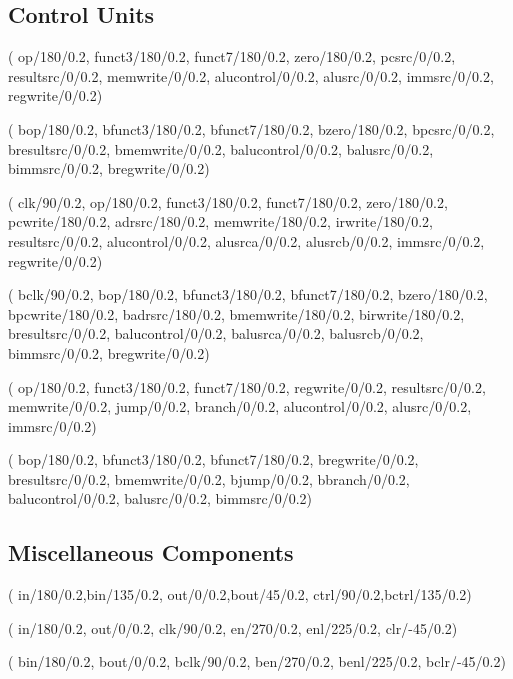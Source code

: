 \documentclass[10pt,a4paper]{scrartcl}
\begin{document}
\subsection{Control Units}
(
op/180/0.2,
funct3/180/0.2,
funct7/180/0.2,
zero/180/0.2,
pcsrc/0/0.2,
resultsrc/0/0.2,
memwrite/0/0.2,
alucontrol/0/0.2,
alusrc/0/0.2,
immsrc/0/0.2,
regwrite/0/0.2)

(
bop/180/0.2,
bfunct3/180/0.2,
bfunct7/180/0.2,
bzero/180/0.2,
bpcsrc/0/0.2,
bresultsrc/0/0.2,
bmemwrite/0/0.2,
balucontrol/0/0.2,
balusrc/0/0.2,
bimmsrc/0/0.2,
bregwrite/0/0.2)

(
clk/90/0.2,
op/180/0.2,
funct3/180/0.2,
funct7/180/0.2,
zero/180/0.2,
pcwrite/180/0.2,
adrsrc/180/0.2,
memwrite/180/0.2,
irwrite/180/0.2,
resultsrc/0/0.2,
alucontrol/0/0.2,
alusrca/0/0.2,
alusrcb/0/0.2,
immsrc/0/0.2,
regwrite/0/0.2)

(
bclk/90/0.2,
bop/180/0.2,
bfunct3/180/0.2,
bfunct7/180/0.2,
bzero/180/0.2,
bpcwrite/180/0.2,
badrsrc/180/0.2,
bmemwrite/180/0.2,
birwrite/180/0.2,
bresultsrc/0/0.2,
balucontrol/0/0.2,
balusrca/0/0.2,
balusrcb/0/0.2,
bimmsrc/0/0.2,
bregwrite/0/0.2)

(
op/180/0.2,
funct3/180/0.2,
funct7/180/0.2,
regwrite/0/0.2,
resultsrc/0/0.2,
memwrite/0/0.2,
jump/0/0.2,
branch/0/0.2,
alucontrol/0/0.2,
alusrc/0/0.2,
immsrc/0/0.2)

(
bop/180/0.2,
bfunct3/180/0.2,
bfunct7/180/0.2,
bregwrite/0/0.2,
bresultsrc/0/0.2,
bmemwrite/0/0.2,
bjump/0/0.2,
bbranch/0/0.2,
balucontrol/0/0.2,
balusrc/0/0.2,
bimmsrc/0/0.2)

\subsection{Miscellaneous Components}
(
in/180/0.2,bin/135/0.2,
out/0/0.2,bout/45/0.2,
ctrl/90/0.2,bctrl/135/0.2)

(
in/180/0.2,
out/0/0.2,
clk/90/0.2,
en/270/0.2,
enl/225/0.2,
clr/-45/0.2)

(
bin/180/0.2,
bout/0/0.2,
bclk/90/0.2,
ben/270/0.2,
benl/225/0.2,
bclr/-45/0.2)
\end{document}
